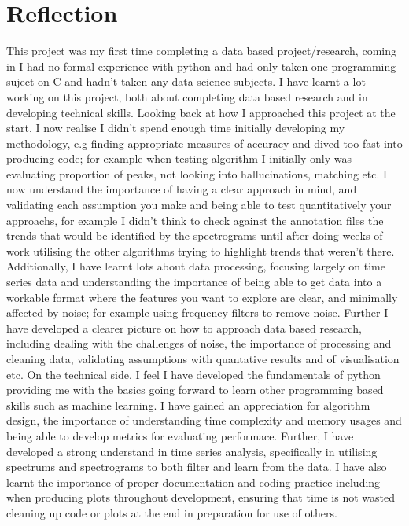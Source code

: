 \section{Reflection}
This project was my first time completing a data
based project/research, coming in I had no formal experience with python and 
had only taken one programming suject on C and hadn't taken any data science subjects. I have learnt a lot working on 
this project, both about completing data based research and in 
developing technical skills. Looking back at how I approached this project 
at the start, I now realise I didn't spend enough time initially developing 
my methodology, e.g finding appropriate measures of accuracy and dived too fast into producing code; for example when testing 
algorithm I initially only was evaluating proportion of peaks, not looking into 
hallucinations, matching etc. I now understand 
the importance of having a clear approach in mind, and validating each assumption 
you make and being able to test quantitatively your approachs, for example I didn't 
think to check against the annotation files the trends that would be identified by the spectrograms until
after doing weeks of work utilising the other algorithms trying to highlight trends that weren't there.  Additionally, 
I have learnt lots about data processing, focusing largely on time series data
and understanding the importance of being able to get data into a workable format
where the features you want to explore are clear, and minimally affected by noise; for example 
using frequency filters to remove noise.  
Further I have developed a clearer picture on how to approach data based research,
including dealing with the challenges of noise, the importance of processing and cleaning data, validating assumptions
with quantative results and of visualisation etc.  On the technical side, 
I feel I have developed the fundamentals of python providing me with the basics
going forward to learn other programming based skills such as machine learning. I have gained an 
appreciation for algorithm design, the importance of understanding 
time complexity and memory usages and being able to develop metrics for evaluating performace. Further, 
I have developed a strong understand in time series analysis, specifically in utilising 
spectrums and spectrograms to both filter and learn from the data. I have also learnt 
the importance of proper documentation and coding practice including when producing plots throughout development, ensuring that time 
is not wasted cleaning up code or plots at the end in preparation for use of others.  

